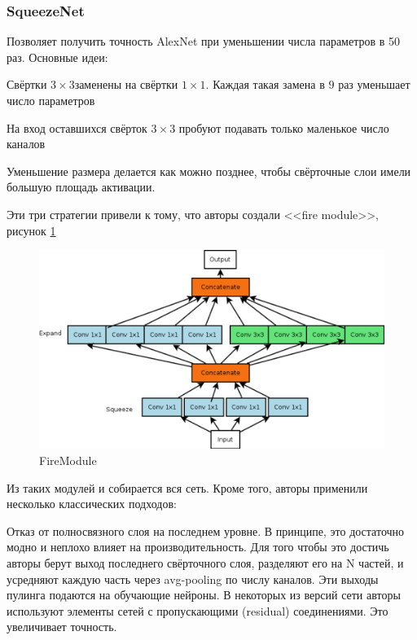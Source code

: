 \subsubsection*{SqueezeNet}
Позволяет получить точность AlexNet при уменьшении числа параметров в 50 раз.
Основные идеи:
\begin{compactitem}

\item Свёртки $ 3\times3  $заменены на свёртки $ 1\times1 $. Каждая такая замена в $ 9 $ раз уменьшает число параметров
\item На вход оставшихся свёрток $  3\times3  $ пробуют подавать только маленькое число каналов
\item Уменьшение размера делается как можно позднее, чтобы свёрточные слои имели большую площадь активации.
\end{compactitem}
Эти три стратегии привели к тому, что авторы создали <<fire module>>, рисунок \ref{fig:firemodule}
\begin{figure}[h]
	\centering
	\includegraphics[width=0.7\linewidth]{img/firemodule}
	\caption{FireModule}
	\label{fig:firemodule}
\end{figure}

Из таких модулей и собирается вся сеть. Кроме того, авторы применили несколько классических подходов:

Отказ от полносвязного слоя на последнем уровне. В принципе, это достаточно модно и неплохо влияет на производительность. Для того чтобы это достичь авторы берут выход последнего свёрточного слоя, разделяют его на N частей, и усредняют каждую часть через avg-pooling по числу каналов. Эти выходы пулинга подаются на обучающие нейроны.
В некоторых из версий сети авторы используют элементы сетей с пропускающими (residual) соединениями. Это увеличивает точность.


